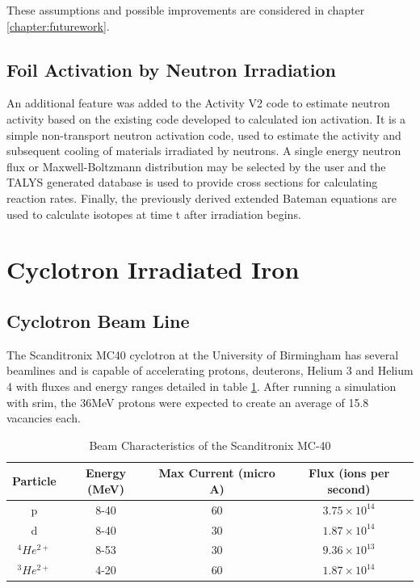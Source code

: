 These assumptions and possible improvements are considered in chapter \ref{chapter:futurework}.


\FloatBarrier



\subsection{Foil Activation by Neutron Irradiation}


An additional feature was added to the Activity V2 code to estimate neutron activity based on the existing code developed to calculated ion activation.  It is a simple non-transport neutron activation code, used to estimate the activity and subsequent cooling of materials irradiated by neutrons.  A single energy neutron flux or Maxwell-Boltzmann distribution may be selected by the user and the TALYS generated database is used to provide cross sections for calculating reaction rates.  Finally, the previously derived extended Bateman equations are used to calculate isotopes at time t after irradiation begins.








\section{Cyclotron Irradiated Iron}

\subsection{Cyclotron Beam Line}

The Scanditronix MC40 cyclotron at the University of Birmingham has several beamlines and is capable of accelerating protons, deuterons, Helium 3 and Helium 4 with fluxes and energy ranges detailed in table \ref{table:scanditronixlimits}.  After running a simulation with \acrshort{srim}, the 36MeV protons were expected to create an average of 15.8 vacancies each.

\begin{table}[h]
\begin{center}
\begin{tabular}{c c c c}
\hline\hline
Particle & Energy (MeV) & Max Current (micro A) & Flux (ions per second)\\
\hline\hline
p & 8-40 & 60 & $3.75 \times 10^14$ \\
d & 8-40 & 30 & $1.87 \times 10^14$ \\
${}^4 He^{2+}$ & 8-53 & 30 & $9.36 \times 10^13$ \\
${}^3 He^{2+}$ & 4-20 & 60 & $1.87 \times 10^14$ \\
\hline\hline
\end{tabular}
\end{center}
\caption{Beam Characteristics of the Scanditronix MC-40}
\label{table:scanditronixlimits}
\end{table}

